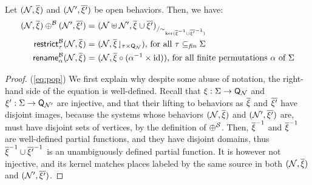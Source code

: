

\ifLongVersion\else
\begin{textAtEnd}[category=proofs]
\fi
\begin{lemma}\label{lemma:direct-char-beh}
  Let $(\mathcal{N},\overline{\xi})$ and $(\mathcal{N}',\overline{\xi'})$ be open behaviors. Then, we have: 
  \begin{align}
    \label{eq:pop}
    (\mathcal{N},\overline{\xi}) \oplus^{\mathcal{B}} (\mathcal{N}',\overline{\xi'}) = & ~{(\mathcal{N} \uplus \mathcal{N}', \overline{\xi} \cup \overline{\xi'})}_{/\sim_{\scriptscriptstyle{\mathrm{ker}(\overline{\xi}^{-1}\cup\overline{\xi'}^{-1})}}} \\
    \label{eq:restrict}
    \mathsf{restrict}^{\mathcal{B}}_{{\tau}}(\mathcal{N},\overline{\xi}) = & ~(\mathcal{N},{\overline{\xi}}\!\downharpoonleft_{\tau\times\mathsf{Q}_{\mathcal{N}}}) \text{, for all } \tau \subseteq_{\mathit{fin}} \Sigma \\
    \label{eq:rename}
    \mathsf{rename}^{\mathcal{B}}_{{\alpha}}(\mathcal{N},\overline{\xi}) = & ~(\mathcal{N},\overline{\xi}\circ(\alpha^{-1} \times \mathrm{id})) \text{, for all finite permutations } \alpha \text{ of } \Sigma
  \end{align}
\end{lemma}
\begin{proof}
  (\ref{eq:pop}) We first explain why despite some abuse of notation,
  the right-hand side of the equation is well-defined. Recall that
  $\xi : \Sigma \rightarrow \mathsf{Q}_{\mathcal{N}}$ and
  $\xi' : \Sigma \rightarrow \mathsf{Q}_{\mathcal{N}'}$ are
  injective, and that their lifting to behaviors as
  $\overline{\xi}$ and $\overline{\xi'}$ have disjoint
  images, because the systems whose behaviors
  $(\mathcal{N},\overline{\xi})$ and
  $(\mathcal{N}',\overline{\xi'})$ are, must have disjoint sets
  of vertices, by the definition of $\oplus^{\mathcal{S}}$. Then,
  $\overline{\xi}^{-1}$ and $\overline{\xi}^{-1}$ are
  well-defined partial functions, and they have disjoint domains, thus
  $\overline{\xi}^{-1}\cup\overline{\xi'}^{-1}$ is an
  unambiguously defined partial function. It is however not injective,
  and its kernel matches places labeled by the same source in both
  $(\mathcal{N},\overline{\xi})$ and
  $(\mathcal{N}',\overline{\xi'})$.


\end{proof}
\end{textAtEnd}
